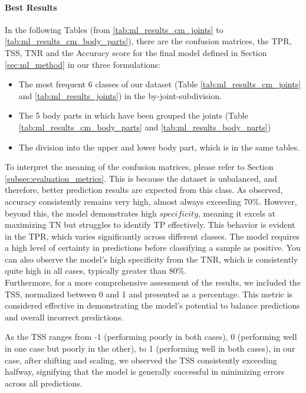 \paragraph{Best Results}
In the following Tables (from \ref{tab:ml_results_cm_joints} to \ref{tab:ml_results_cm_body_parts}), there are the confusion matrices, the TPR, TSS, TNR and the Accuracy score for the final model defined in Section \ref{sec:ml_method} in our three formulations:
\begin{itemize}
  \item The most frequent 6 classes of our dataset (Table \ref{tab:ml_results_cm_joints} and \ref{tab:ml_results_joints}) in the by-joint-subdivision.
  \item The 5 body parts in which have been grouped the joints (Table \ref{tab:ml_results_cm_body_parts} and \ref{tab:ml_results_body_parts})
  \item The division into the upper and lower body part, which is in the same tables.
\end{itemize} 
To interpret the meaning of the confusion matrices, please refer to Section \ref{subsec:evaluation_metrics}.
This is because the dataset is unbalanced, and therefore, better prediction results are expected from this class.
As observed, accuracy consistently remains very high, almost always exceeding 70\%.
However, beyond this, the model demonstrates high $specificity$, meaning it excels at maximizing TN but struggles to identify TP effectively.
This behavior is evident in the TPR, which varies significantly across different classes.
The model requires a high level of certainty in predictions before classifying a sample as positive.
You can also observe the model's high specificity from the TNR, which is consistently quite high in all cases, typically greater than 80\%. \\

Furthermore, for a more comprehensive assessment of the results, we included the TSS, normalized between 0 and 1 and presented as a percentage. 
This metric is considered effective in demonstrating the model's potential to balance predictions and overall incorrect predictions.

As the TSS ranges from -1 (performing poorly in both cases), 0 (performing well in one case but poorly in the other), to 1 (performing well in both cases), in our case, after shifting and scaling, 
we observed the TSS consistently exceeding halfway, signifying that the model is generally successful in minimizing errors across all predictions. 

